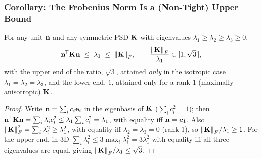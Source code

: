 \subsubsection{Corollary: The Frobenius Norm Is a (Non-Tight) Upper Bound}
\begin{corollary}
\label{cor:frobenius}
For any unit $\mathbf{n}$ and any symmetric PSD $\mathbf{K}$ with eigenvalues
$\lambda_1\geq\lambda_2\geq\lambda_3\geq0$,
\begin{equation}
  \mathbf{n}^{\!\top}\mathbf{K}\mathbf{n} \; \leq \; \lambda_1 \; \leq \; \norm{\mathbf{K}}_F ,
  \qquad
  \frac{\norm{\mathbf{K}}_F}{\lambda_1} \in [1,\sqrt3\,] ,
\end{equation}
with the upper end of the ratio, $\sqrt3$, attained \emph{only} in the
isotropic case $\lambda_1=\lambda_2=\lambda_3$, and the lower end, $1$,
attained only for a rank-1 (maximally anisotropic) $\mathbf{K}$.
\end{corollary}
\begin{proof}
Write $\mathbf{n}=\sum_i c_i\mathbf e_i$ in the eigenbasis of $\mathbf{K}$
($\sum_ic_i^2=1$); then $\mathbf{n}^{\!\top}\mathbf{K}\mathbf{n}=\sum_i\lambda_ic_i^2
\leq\lambda_1\sum_ic_i^2=\lambda_1$, with equality iff $\mathbf{n}=\mathbf
e_1$. Also $\norm{\mathbf{K}}_F^2=\sum_i\lambda_i^2\geq\lambda_1^2$, with
equality iff $\lambda_2=\lambda_3=0$ (rank 1), so $\norm{\mathbf{K}}_F/\lambda_1
\geq1$. For the upper end, in 3D $\sum_i\lambda_i^2 \leq
3\max_i\lambda_i^2=3\lambda_1^2$ with equality iff all three eigenvalues
are equal, giving $\norm{\mathbf{K}}_F/\lambda_1\leq\sqrt3$.
\end{proof}

